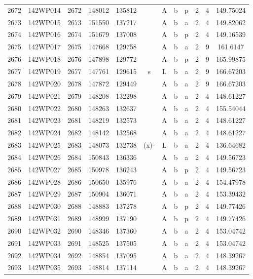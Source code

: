 \begin{tabular}{|*{12}{c|}}
2672 & 142WP014 & 2672 & 148012 & 135812 &  & A & b & p & 2 & 4 & 149.75024 \\ 
2673 & 142WP015 & 2673 & 151550 & 137217 &  & A & b & a & 2 & 4 & 149.82062 \\ 
2674 & 142WP016 & 2674 & 151679 & 137008 &  & A & b & p & 2 & 4 & 149.16539 \\ 
2675 & 142WP017 & 2675 & 147668 & 129758 &  & A & b & a & 2 & 9 & 161.6147 \\ 
2676 & 142WP018 & 2676 & 147898 & 129772 &  & A & b & p & 2 & 9 & 165.99875 \\ 
2677 & 142WP019 & 2677 & 147761 & 129615 & s & L & b & a & 2 & 9 & 166.67203 \\ 
2678 & 142WP020 & 2678 & 147872 & 129449 &  & A & b & a & 2 & 9 & 166.67203 \\ 
2679 & 142WP021 & 2679 & 148208 & 132298 &  & A & b & a & 2 & 4 & 148.61227 \\ 
2680 & 142WP022 & 2680 & 148263 & 132637 &  & A & b & a & 2 & 4 & 155.54044 \\ 
2681 & 142WP023 & 2681 & 148219 & 132573 &  & A & b & a & 2 & 4 & 148.61227 \\ 
2682 & 142WP024 & 2682 & 148142 & 132568 &  & A & b & a & 2 & 4 & 148.61227 \\ 
2683 & 142WP025 & 2683 & 148073 & 132738 & (x)- & L & b & a & 2 & 4 & 136.64682 \\ 
2684 & 142WP026 & 2684 & 150843 & 136336 &  & A & b & a & 2 & 4 & 149.56723 \\ 
2685 & 142WP027 & 2685 & 150978 & 136243 &  & A & b & p & 2 & 4 & 149.56723 \\ 
2686 & 142WP028 & 2686 & 150650 & 135976 &  & A & b & a & 2 & 4 & 154.47978 \\ 
2687 & 142WP029 & 2687 & 150904 & 136071 &  & A & b & a & 2 & 4 & 153.39432 \\ 
2688 & 142WP030 & 2688 & 148883 & 137278 &  & A & b & p & 2 & 4 & 149.77426 \\ 
2689 & 142WP031 & 2689 & 148999 & 137190 &  & A & b & p & 2 & 4 & 149.77426 \\ 
2690 & 142WP032 & 2690 & 148346 & 137360 &  & A & b & a & 2 & 4 & 153.04742 \\ 
2691 & 142WP033 & 2691 & 148525 & 137505 &  & A & b & a & 2 & 4 & 153.04742 \\ 
2692 & 142WP034 & 2692 & 148854 & 137095 &  & A & b & a & 2 & 4 & 148.39267 \\ 
2693 & 142WP035 & 2693 & 148814 & 137114 &  & A & b & a & 2 & 4 & 148.39267 \\ 

\end{tabular}
